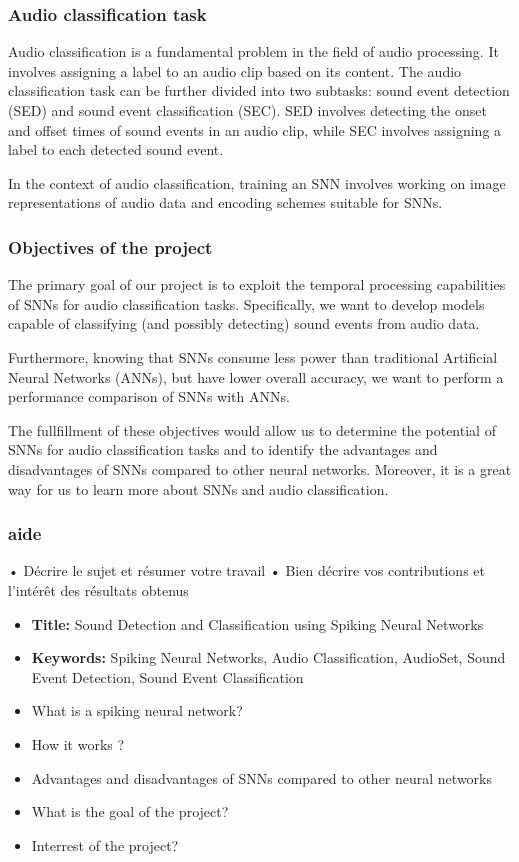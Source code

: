 \documentclass[11pt]{article}
\begin{document}
\subsubsection{Audio classification task}

Audio classification is a fundamental problem in the field of audio processing. It involves assigning a label to an audio clip based on its content. The audio classification task can be further divided into two subtasks: sound event detection (SED) and sound event classification (SEC). SED involves detecting the onset and offset times of sound events in an audio clip, while SEC involves assigning a label to each detected sound event.

In the context of audio classification, training an SNN involves working on image representations of audio data and encoding schemes suitable for SNNs.


\subsubsection{Objectives of the project}

The primary goal of our project is to exploit the temporal processing capabilities of SNNs for audio classification tasks. Specifically, we want to develop models capable of classifying (and possibly detecting) sound events from audio data.

Furthermore, knowing that SNNs consume less power than traditional Artificial Neural Networks (ANNs), but have lower overall accuracy, we want to perform a performance comparison of SNNs with ANNs.

The fullfillment of these objectives would allow us to determine the potential of SNNs for audio classification tasks and to identify the advantages and disadvantages of SNNs compared to other neural networks. Moreover, it is a great way for us to learn more about SNNs and audio classification.

\subsubsection*{aide}
•	Décrire le sujet et résumer votre travail
•	Bien décrire vos contributions et l’intérêt des résultats obtenus


\begin{itemize}
  \item \textbf{Title:} Sound Detection and Classification using Spiking Neural Networks
  \item \textbf{Keywords:} Spiking Neural Networks, Audio Classification, AudioSet, Sound Event Detection, Sound Event Classification
  \item What is a spiking neural network?
  \item How it works ?
  \item Advantages and disadvantages of SNNs compared to other neural networks
  \item What is the goal of the project?
  \item Interrest of the project?
\end{itemize}
\end{document}
